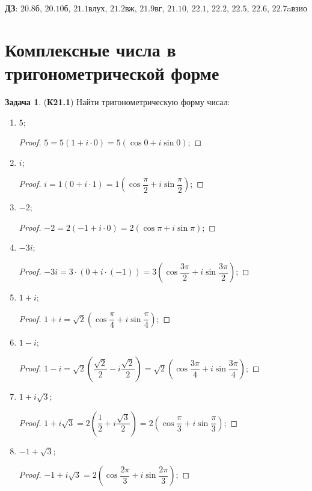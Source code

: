 \documentclass[12pt]{article}
\newcommand{\RN}[1]{%
	\textup{\uppercase\expandafter{\romannumeral#1}}%
}
\theoremstyle{definition}
\newtheorem{problem}{Задача}
\begin{document}
\lhead{Алгебра-\RN{1}}
\textbf{ДЗ}: $20.8$б, $20.10$б, $21.1$влух, $21.2$вж, $21.9$вг, $21.10$, $22.1$, $22.2$, $22.5$, $22.6$, $22.7$aвзио
\section*{Комплексные числа в тригонометрической форме}
\begin{problem}(\textbf{К21.1}) Найти тригонометрическую форму чисал:
	\begin{enumerate}[label=\asbuk*)]
		\item $5$;
		\begin{proof}
			$5 = 5(1 + i{\cdot}0) = 5(\cos0 + i\sin0)$;
		\end{proof}
		\item $i$;
		\begin{proof}
			$i = 1(0 + i{\cdot}1) = 1\left(\cos\dfrac{\pi}{2} + i\sin{\dfrac{\pi}{2}}\right)$;
		\end{proof}
		\item $-2$;
		\begin{proof}
			$-2 = 2(-1 + i{\cdot}0) = 2(\cos\pi + i\sin\pi)$;
		\end{proof}
		\item $-3i$;
		\begin{proof}
			$-3i = 3{\cdot}(0 + i{\cdot}(-1)) = 3\left(\cos\dfrac{3\pi}{2} + i\sin\dfrac{3\pi}{2}\right)$;
		\end{proof}
		\item $1 + i$;
		\begin{proof}
			$1 + i = \sqrt{2}\left(\cos\dfrac{\pi}{4} + i \sin\dfrac{\pi}{4}\right)$;
		\end{proof}
		\item $1 - i$;
		\begin{proof}
			$1 - i = \sqrt{2}\left(\dfrac{\sqrt{2}}{2} -i\dfrac{\sqrt{2}}{2}\right) = \sqrt{2}\left(\cos\dfrac{3\pi}{4} + i\sin\dfrac{3\pi}{4}\right)$;
		\end{proof}
		\item $1 + i\sqrt{3}$;
		\begin{proof}
			$1 + i\sqrt{3} = 2\left(\dfrac{1}{2} + i\dfrac{\sqrt{3}}{2}\right) = 2\left(\cos\dfrac{\pi}{3} + i\sin\dfrac{\pi}{3}\right)$;
		\end{proof}
		\item $-1 + \sqrt{3}$;
		\begin{proof}
			$-1 + i\sqrt{3} = 2\left(\cos\dfrac{2\pi}{3} + i \sin\dfrac{2\pi}{3}\right)$;
		\end{proof}

\end{enumerate}
\end{problem}
\end{document}
